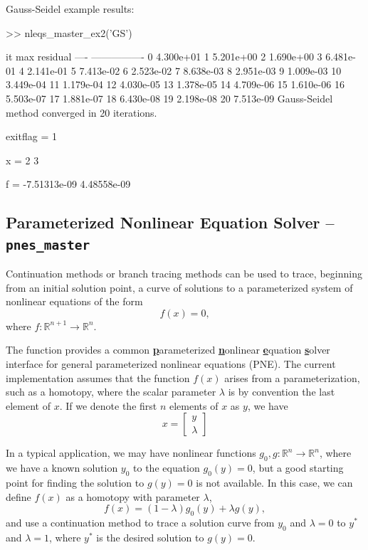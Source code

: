 \documentclass[12pt]{article}
\newcommand{\code}[1]{{\relsize{-0.5}{\tt{{#1}}}}}  %
\newcommand{\R}{\mathbb{R}}          %
\numberwithin{equation}{section}
\numberwithin{table}{section}
\numberwithin{figure}{section}
\begin{document}
\clearpage
\noindent Gauss-Seidel example results:
\begin{Code}
>> nleqs_master_ex2('GS')

 it     max residual
----  ----------------
  0      4.300e+01
  1      5.201e+00
  2      1.690e+00
  3      6.481e-01
  4      2.141e-01
  5      7.413e-02
  6      2.523e-02
  7      8.638e-03
  8      2.951e-03
  9      1.009e-03
 10      3.449e-04
 11      1.179e-04
 12      4.030e-05
 13      1.378e-05
 14      4.709e-06
 15      1.610e-06
 16      5.503e-07
 17      1.881e-07
 18      6.430e-08
 19      2.198e-08
 20      7.513e-09
Gauss-Seidel method converged in 20 iterations.

exitflag = 1

x = 
    2
    3

f = 
   -7.51313e-09
    4.48558e-09
\end{Code}



\clearpage
\subsection{Parameterized Nonlinear Equation Solver -- {\tt pnes\_master}}
\label{sec:pnes_master}

Continuation methods or branch tracing methods can be used to trace, beginning from an initial solution point, a curve of solutions to a parameterized system of nonlinear equations of the form
\begin{equation}
f(x) = 0, \label{eq:pne}
\end{equation}
where $f \colon \R^{n+1} \to \R^n$.

The \code{pnes\_master} function provides a common \textbf{\underline{p}}arameterized \textbf{\underline{n}}onlinear \textbf{\underline{e}}quation \textbf{\underline{s}}olver interface for general parameterized nonlinear equations (PNE). The current implementation assumes that the function $f(x)$ arises from a parameterization, such as a homotopy, where the scalar parameter $\lambda$ is by convention the last element of $x$. If we denote the first $n$ elements of $x$ as $y$, we have
\begin{equation}
x = \left[\begin{array}{c}y \\ \lambda\end{array}\right] \label{eq:pne_x}
\end{equation}

In a typical application, we may have nonlinear functions $g_0, g \colon \R^n \to \R^n$, where we have a known solution $y_0$ to the equation $g_0(y) = 0$, but a good starting point for finding the solution to $g(y) = 0$ is not available. In this case, we can define $f(x)$ as a homotopy with parameter $\lambda$,
\begin{equation}
f(x) = (1 - \lambda) g_0(y) + \lambda g(y), \label{eq:pne_fx}
\end{equation}
and use a continuation method to trace a solution curve from $y_0$ and $\lambda = 0$ to $y^*$ and $\lambda = 1$, where $y^*$ is the desired solution to $g(y) = 0$.
\end{document}
